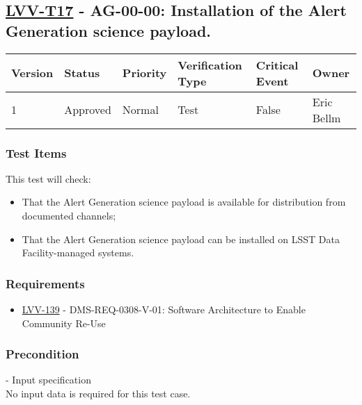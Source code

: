 \subsection{\texorpdfstring{\href{https://jira.lsstcorp.org/secure/Tests.jspa\#/testCase/LVV-T17}{LVV-T17}
- AG-00-00: Installation of the Alert Generation science
payload.}{LVV-T17 - AG-00-00: Installation of the Alert Generation science payload.}}\label{lvv-t17---ag-00-00-installation-of-the-alert-generation-science-payload.}

\begin{longtable}[]{@{}llllll@{}}
\toprule
Version & Status & Priority & Verification Type & Critical Event &
Owner\tabularnewline
\midrule
\endhead
1 & Approved & Normal & Test & False & Eric Bellm\tabularnewline
\bottomrule
\end{longtable}

\subsubsection{Test Items}\label{test-items}

This test will check:

\begin{itemize}
\tightlist
\item
  That the Alert Generation science payload is available for
  distribution from documented channels;
\item
  That the Alert Generation science payload can be installed on LSST
  Data Facility-managed systems.
\end{itemize}

\subsubsection{Requirements}\label{requirements}

\begin{itemize}
\tightlist
\item
  \href{https://jira.lsstcorp.org/browse/LVV-139}{LVV-139} -
  DMS-REQ-0308-V-01: Software Architecture to Enable Community Re-Use
\end{itemize}

\subsubsection{Precondition}\label{precondition}

- Input specification\\[2\baselineskip]No input data is required for
this test case.

